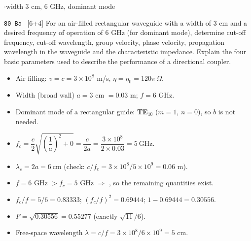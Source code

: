 {\color{sub}\footnotesize {} \gap$\cdot$\gap width 3 cm, 6 GHz, dominant mode}

\begin{asked}{\texttt{80 Ba} \ [6+4]}
For an air-filled rectangular waveguide with a width of 3 cm and a desired frequency of operation of 6 GHz (for dominant mode), determine cut-off frequency, cut-off wavelength, group velocity, phase velocity, propagation wavelength in the waveguide and the characteristic impedance. Explain the four basic parameters used to describe the performance of a directional coupler.
\end{asked}
\begin{itemize}
  \item Air filling: $v = c = 3\times10^8$ m/s, $\eta = \eta_0 = 120\pi\,\Omega$.
  \item Width (broad wall) $a = 3$ cm $= 0.03$ m; $f = 6$ GHz.
  \item Dominant mode of a rectangular guide: \textbf{TE$_{10}$} ($m = 1$, $n = 0$), so $b$
    is not needed.
\end{itemize}
\begin{itemize}
  \item $f_c = \dfrac{c}{2}\sqrt{\left(\dfrac{1}{a}\right)^2 + 0} = \dfrac{c}{2a}
    = \dfrac{3\times10^8}{2 \times 0.03} = \boxed{5\ \text{GHz}}$.
  \item $\lambda_c = 2a = \boxed{6\ \text{cm}}$ \quad (check: $c/f_c = 3\times10^8/5\times10^9 = 0.06$ m).
  \item $f = 6$ GHz $> f_c = 5$ GHz $\Rightarrow$ , so the
    remaining quantities exist.
\end{itemize}
\begin{itemize}
  \item $f_c/f = 5/6 = 0.83333$; \quad $(f_c/f)^2 = 0.69444$; \quad $1 - 0.69444 = 0.30556$.
  \item $F = \sqrt{0.30556} = \boxed{0.55277}$ \quad (exactly $\sqrt{11}/6$).
  \item Free-space wavelength $\lambda = c/f = 3\times10^8/6\times10^9 = 5$ cm.
\end{itemize}
\par{}
